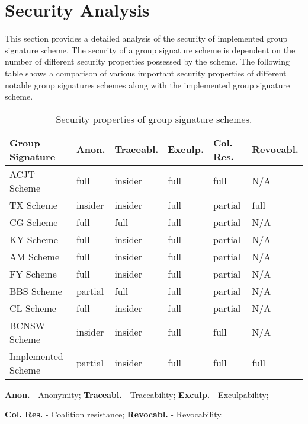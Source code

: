 \section{Security Analysis}
This section provides a detailed analysis of the security of implemented group signature scheme. The security of a group signature scheme is dependent on the number of different security properties possessed by the scheme. The following table shows a comparison of various important security properties of different notable group signatures schemes along with the implemented group signature scheme.
\begin{table}[!h]
\begin{threeparttable}
\renewcommand{\arraystretch}{1.3}
\caption{Security properties of group signature schemes.}
\label{table:securityproperties}
\centering
\begin{tabular}{| >{\arraybackslash}m{1.5in} |>{\centering\arraybackslash}m{0.6in} |>{\centering\arraybackslash}m{0.8in} |>{\centering\arraybackslash}m{0.7in} |>{\centering\arraybackslash}m{0.8in} |>{\centering\arraybackslash}m{0.8in} |}

\hline 
\textbf{Group Signature} & \textbf{Anon.} & \textbf{Traceabl.} & \textbf{Exculp.} & \textbf{Col. Res.} & \textbf{Revocabl.} \\ 
\hline\hline

ACJT Scheme		 	& full	 & insider & full & full 	 & N/A  \\ \hline
TX Scheme		 	& insider& insider & full & partial  & full \\ \hline
CG Scheme  		 	& full	 & full	   & full & partial  & N/A  \\ \hline
KY Scheme  			& full	 & insider & full & partial  & N/A  \\ \hline\hline
AM Scheme  		 	& full	 & insider & full & partial  & N/A  \\ \hline
FY Scheme  		 	& full 	 & insider & full & partial  & N/A  \\ \hline\hline
BBS Scheme		 	& partial& full	   & full & partial  & N/A  \\ \hline
CL Scheme		 	& full 	 & insider & full & partial  & N/A  \\ \hline
BCNSW Scheme	 	& insider& insider & full & full 	 & N/A  \\ \hline\hline
Implemented Scheme	& partial& insider & full & full 	 & full \\ \hline

\end{tabular}
\begin{tablenotes}
\item \textbf{Anon.} - Anonymity; \textbf{Traceabl.} - Traceability; \textbf{Exculp.} - Exculpability;
\item \textbf{Col. Res.} - Coalition resistance; \textbf{Revocabl.} - Revocability.

\end{tablenotes}
\end{threeparttable}
\end{table}

